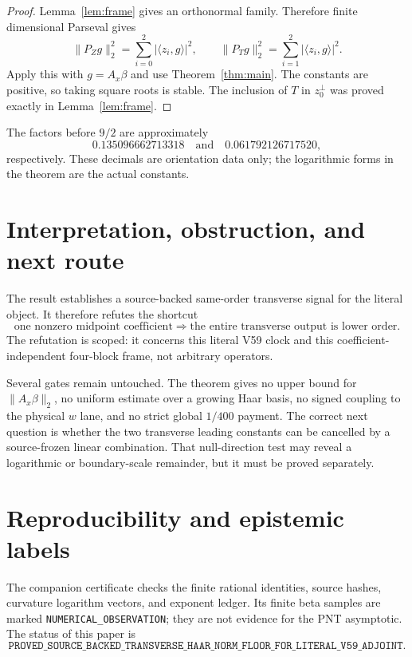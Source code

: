 \documentclass[10pt]{article}
\newcommand{\ip}[2]{\langle #1,#2\rangle}
\newcommand{\Ax}{A_x}
\begin{document}
\begin{proof}
Lemma~\ref{lem:frame} gives an orthonormal family.  Therefore finite
dimensional Parseval gives
\[
 \|P_Zg\|_2^2=\sum_{i=0}^2|\ip{z_i}{g}|^2,
 \qquad \|P_Tg\|_2^2=\sum_{i=1}^2|\ip{z_i}{g}|^2.
\]
Apply this with \(g=\Ax\beta\) and use Theorem~\ref{thm:main}.  The
constants are positive, so taking square roots is stable.  The inclusion of
\(T\) in \(z_0^\perp\) was proved exactly in Lemma~\ref{lem:frame}.
\end{proof}

The factors before \(9/2\) are approximately
\[
 0.135096662713318\quad\text{and}\quad0.061792126717520,
\]
respectively.  These decimals are orientation data only; the logarithmic
forms in the theorem are the actual constants.

\section{Interpretation, obstruction, and next route}

The result establishes a source-backed same-order transverse signal for the
literal object.  It therefore refutes the shortcut
\[
 \text{one nonzero midpoint coefficient}
 \Longrightarrow
 \text{the entire transverse output is lower order}.
\]
The refutation is scoped: it concerns this literal V59 clock and this
coefficient-independent four-block frame, not arbitrary operators.

Several gates remain untouched.  The theorem gives no upper bound for
\(\|\Ax\beta\|_2\), no uniform estimate over a growing Haar basis, no signed
coupling to the physical \(w\) lane, and no strict global \(1/400\) payment.
The correct next question is whether the two transverse leading constants
can be cancelled by a source-frozen linear combination.  That null-direction
test may reveal a logarithmic or boundary-scale remainder, but it must be
proved separately.

\section*{Reproducibility and epistemic labels}

The companion certificate checks the finite rational identities, source hashes,
curvature logarithm vectors, and exponent ledger.  Its finite beta samples are
marked \texttt{NUMERICAL\_OBSERVATION}; they are not evidence for the PNT
asymptotic.  The status of this paper is
\[
\texttt{PROVED\_SOURCE\_BACKED\_TRANSVERSE\_HAAR\_NORM\_FLOOR\_FOR\_LITERAL\_V59\_ADJOINT}.
\]



\end{document}
